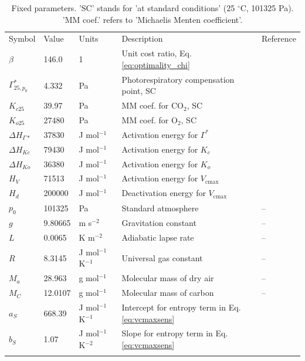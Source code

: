 \documentclass[gmd, manuscript]{copernicus}
\newcommand{\vcmax}{$V_{\text{cmax}}$}
\begin{document}
\begin{table}
\caption{Fixed parameters. 'SC' stands for 'at standard conditions' (25 $^{\circ}$C, 101325 Pa). 'MM coef.' refers to 'Michaelis Menten coefficient'.}
\begin{tabular}{lllll}
  \tophline
    Symbol     & Value   & Units         & Description           &  Reference   \\
  \middlehline
    $\beta$      & 146.0     & 1             & Unit cost ratio, Eq. \ref{eq:optimality_chi} & \citet{Wang2017-ls} \\
  $\Gamma^\ast_{25, p_0}$ & 4.332 & Pa & Photorespiratory compensation point, SC & \citet{bernacchi01} \\
  $K_{c25}$    & 39.97   & Pa            & MM coef. for CO$_2$, SC&  \citet{bernacchi01} \\
  $K_{o25}$    & 27480   & Pa            & MM coef. for O$_2$, SC&  \citet{bernacchi01} \\
  $\Delta H_{\Gamma\ast}$ & 37830 & J mol$^{-1}$ & Activation energy for $\Gamma^\ast$  & \citet{bernacchi01} \\
  $\Delta H_{Kc}$ & 79430  & J mol$^{-1}$  & Activation energy for $K_c$&  \citet{bernacchi01} \\
  $\Delta H_{Ko}$ & 36380  & J mol$^{-1}$  & Activation energy for $K_o$&  \citet{bernacchi01} \\
  $H_V$        & 71513   & J mol$^{-1}$  & Activation energy for \vcmax\ & \citet{kattge07} \\
  $H_d$        & 200000   & J mol$^{-1}$  & Deactivation energy for \vcmax\ & \citet{kattge07} \\
  $p_0$        & 101325  & Pa            & Standard atmosphere   & -- \\
  $g$          & 9.80665 & m s$^{-2}$    & Gravitation constant  & -- \\
  $L$          & 0.0065  & K m$^{-2}$    & Adiabatic lapse rate  & -- \\
  $R$          & 8.3145  & J mol$^{-1}$ K$^{-1}$ & Universal gas constant & -- \\
  $M_a$        & 28.963  & g mol$^{-1}$  & Molecular mass of dry air & -- \\
    $M_C$        & 12.0107 & g mol$^{-1} $ & Molecular mass of carbon & -- \\ 
  $a_S$        & 668.39  & J mol$^{-1}$ K$^{-1}$ & Intercept for entropy term in Eq. \ref{eq:vcmaxsens} & \citet{kattge07} \\
  $b_S$        & 1.07  & J mol$^{-1}$ K$^{-2}$ & Slope for entropy term in Eq. \ref{eq:vcmaxsens} & \citet{kattge07} \\
  \bottomhline
\end{tabular}
\label{tab:params}
\end{table}
\end{document}
